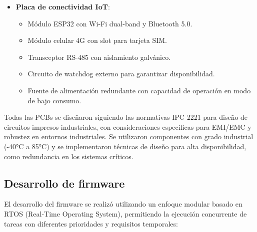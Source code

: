 \documentclass{report}          %
\begin{document}
\begin{itemize}
                    \item \textbf{Placa de conectividad IoT}:
                        \begin{itemize}
                            \item Módulo ESP32 con Wi-Fi dual-band y Bluetooth 5.0.
                            \item Módulo celular 4G con slot para tarjeta SIM.
                            \item Transceptor RS-485 con aislamiento galvánico.
                            \item Circuito de watchdog externo para garantizar disponibilidad.
                            \item Fuente de alimentación redundante con capacidad de operación en modo de bajo consumo.
                        \end{itemize}
                \end{itemize}

                Todas las PCBs se diseñaron siguiendo las normativas IPC-2221 para diseño de circuitos impresos industriales, con consideraciones específicas para EMI/EMC y robustez en entornos industriales. Se utilizaron componentes con grado industrial (-40°C a 85°C) y se implementaron técnicas de diseño para alta disponibilidad, como redundancia en los sistemas críticos.

            \subsection{Desarrollo de firmware}
                El desarrollo del firmware se realizó utilizando un enfoque modular basado en RTOS (Real-Time Operating System), permitiendo la ejecución concurrente de tareas con diferentes prioridades y requisitos temporales:
\end{document}
